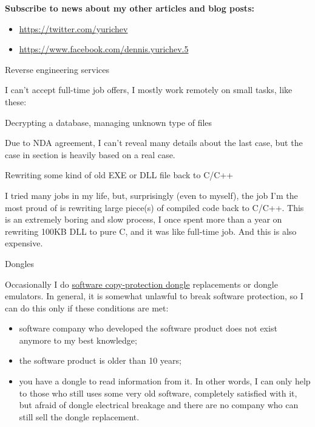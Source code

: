 
\large \textbf{Subscribe to news about my other articles and blog posts:}

\bigskip

\begin{itemize}

\item \url{https://twitter.com/yurichev}

\item \url{https://www.facebook.com/dennis.yurichev.5}

\end{itemize}

\bigskip
\huge Reverse engineering services
\normalsize

\bigskip
\bigskip

I can't accept full-time job offers, I mostly work remotely on small tasks, like these:

\large Decrypting a database, managing unknown type of files \normalsize

Due to NDA agreement, I can't reveal many details about the last case, but the case in  section
is heavily based on a real case.

\large Rewriting some kind of old EXE or DLL file back to C/C++ \normalsize

I tried many jobs in my life, but, surprisingly (even to myself),
the job I'm the most proud of is rewriting large piece(s) of compiled code back to C/C++.
This is an extremely boring and slow process, I once spent more than a year on rewriting 100KB DLL to pure C,
and it was like full-time job.
And this is also expensive.

\large Dongles \normalsize

Occasionally I do \href{https://en.wikipedia.org/wiki/Software_protection_dongle}{software copy-protection dongle} replacements or dongle emulators. In general, it is somewhat unlawful to break software protection, so I can do this only if these conditions are met:

\begin{itemize}
\item software company who developed the software product does not exist anymore to my best knowledge;
\item the software product is older than 10 years;
\item you have a dongle to read information from it. In other words, I can only help to those who still uses some very old software, completely satisfied with it, but afraid of dongle electrical breakage and there are no company who can still sell the dongle replacement.
\end{itemize}

